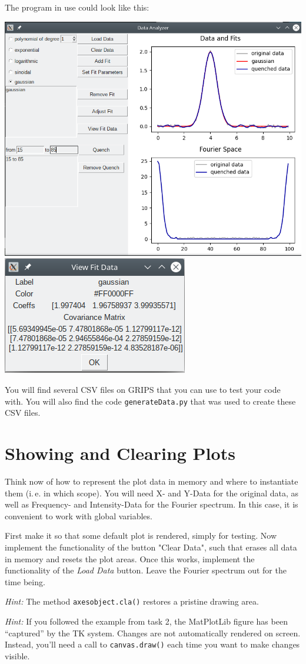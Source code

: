 \documentclass[
	english,
	fontsize=10pt,
	parskip=half,
	titlepage=true,
	DIV=12
]{scrartcl}
\newcommand*{\ie}{i.\,e.\xspace}
\begin{document}
The program in use could look like this:
\begin{center}
	\includegraphics[width=.6\linewidth]{./tk-MainWin-used}
	\qquad
	\includegraphics[width=.25\linewidth]{./tk-ViewFitData}
\end{center}

You will find several CSV files on GRIPS that you can use to test your code with. You will also find the code \texttt{generateData.py} that was used to create these CSV files.

\section{Showing and Clearing Plots}
Think now of how to represent the plot data in memory and where to instantiate them (\ie in which scope). You will need X- and Y-Data for the original data, as well as Frequency- and Intensity-Data for the Fourier spectrum. In this case, it is convenient to work with global variables.

First make it so that some default plot is rendered, simply for testing. Now implement the functionality of the button "Clear Data", such that erases all data in memory and resets the plot areas. Once this works, implement the functionality of the \emph{Load Data} button. Leave the Fourier spectrum out for the time being.

\emph{Hint:} The method \texttt{axesobject.cla()} restores a pristine drawing area.

\emph{Hint:} If you followed the example from task 2, the MatPlotLib figure has been \enquote{captured} by the TK system. Changes are not automatically rendered on screen. Instead, you'll need a call to \texttt{canvas.draw()} each time you want to make changes visible.
\end{document}

